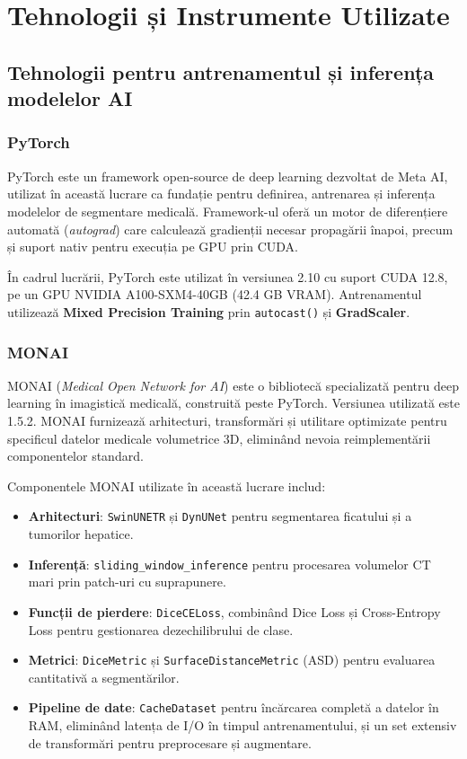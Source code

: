 \documentclass[12pt, a4paper]{report}
\begin{document}
\chapter{Tehnologii și Instrumente Utilizate}

\section{Tehnologii pentru antrenamentul și inferența modelelor AI}

\subsection{PyTorch}

PyTorch este un framework open-source de deep learning dezvoltat de Meta AI,
utilizat în această lucrare ca fundație pentru definirea, antrenarea și inferența
modelelor de segmentare medicală. Framework-ul oferă un motor de diferențiere
automată (\textit{autograd}) care calculează gradienții necesar propagării
înapoi, precum și suport nativ pentru execuția pe GPU prin CUDA.

În cadrul lucrării, PyTorch este utilizat în versiunea 2.10 cu suport CUDA 12.8,
pe un GPU NVIDIA A100-SXM4-40GB (42.4 GB VRAM). Antrenamentul utilizează
\textbf{Mixed Precision Training} prin \texttt{autocast()} și \textbf{GradScaler}.




\subsection{MONAI}

MONAI (\textit{Medical Open Network for AI}) este o bibliotecă specializată
pentru deep learning în imagistică medicală, construită peste PyTorch. Versiunea
utilizată este 1.5.2. MONAI furnizează arhitecturi, transformări și utilitare
optimizate pentru specificul datelor medicale volumetrice 3D, eliminând nevoia
reimplementării componentelor standard.

Componentele MONAI utilizate în această lucrare includ:
\begin{itemize}
    \item \textbf{Arhitecturi}: \texttt{SwinUNETR} și \texttt{DynUNet} pentru
          segmentarea ficatului și a tumorilor hepatice.
    \item \textbf{Inferență}: \texttt{sliding\_window\_inference} pentru
          procesarea volumelor CT mari prin patch-uri cu suprapunere.
    \item \textbf{Funcții de pierdere}: \texttt{DiceCELoss}, combinând
          Dice Loss și Cross-Entropy Loss pentru gestionarea dezechilibrului
          de clase.
 \item \textbf{Metrici}: \texttt{DiceMetric} și \texttt{SurfaceDistanceMetric}
          (ASD) pentru evaluarea cantitativă a segmentărilor.


    \item \textbf{Pipeline de date}: \texttt{CacheDataset} pentru încărcarea
          completă a datelor în RAM, eliminând latența de I/O în timpul
          antrenamentului, și un set extensiv de transformări pentru
          preprocesare și augmentare.
\end{itemize}
\end{document}
